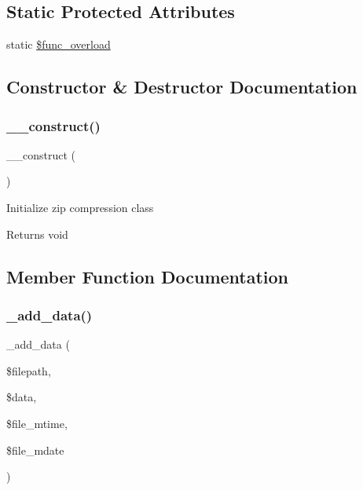 \subsection*{Static Protected Attributes}
\begin{DoxyCompactItemize}
\item 
static \mbox{\hyperlink{class_c_i___zip_aef84be58d58a5895572c5689e56a1047}{\$func\+\_\+overload}}
\end{DoxyCompactItemize}


\subsection{Constructor \& Destructor Documentation}
\mbox{\label{class_c_i___zip_a095c5d389db211932136b53f25f39685}} 
\subsubsection{\texorpdfstring{\+\_\+\+\_\+construct()}{\_\_construct()}}
{\footnotesize\ttfamily \+\_\+\+\_\+construct (\begin{DoxyParamCaption}{ }\end{DoxyParamCaption})}

Initialize zip compression class

\begin{DoxyReturn}{Returns}
void 
\end{DoxyReturn}


\subsection{Member Function Documentation}
\mbox{\label{class_c_i___zip_a4ff8a5ea57979ec1a44cc9e443acf26d}} 
\subsubsection{\texorpdfstring{\+\_\+add\+\_\+data()}{\_add\_data()}}
{\footnotesize\ttfamily \+\_\+add\+\_\+data (\begin{DoxyParamCaption}\item[{}]{\$filepath,  }\item[{}]{\$data,  }\item[{}]{\$file\+\_\+mtime,  }\item[{}]{\$file\+\_\+mdate }\end{DoxyParamCaption})\hspace{0.3cm}{\ttfamily [protected]}}

